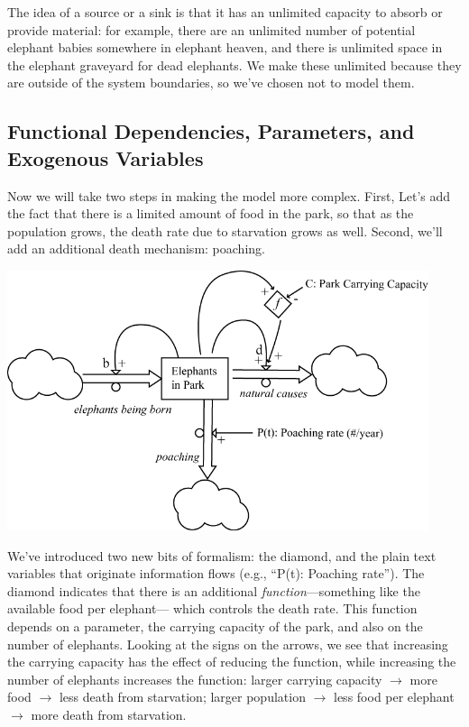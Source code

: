 The idea of a source or a sink is that it has an unlimited capacity to absorb or provide material:  for example, there are an unlimited number of potential elephant babies somewhere in elephant heaven, and there is unlimited space in the elephant graveyard for dead elephants.  We make these unlimited because they are outside of the system boundaries, so we've chosen not to model them.

\subsection{Functional Dependencies, Parameters, and Exogenous Variables}

Now we will take two steps in making the model more complex.  First, Let's add the fact that there is a limited amount of food in the park, so that as the population grows, the death rate due to starvation grows as well.  Second, we'll add an additional death mechanism:  poaching.

\beforefig
\includegraphics[height=3in]{figs/ElephantStockAndFlow2}
\afterfig


We've introduced two new bits of formalism: the diamond, and the plain text variables that originate information flows (e.g., ``P(t): Poaching rate'').  The diamond indicates that there is an additional {\it function}---something like the available food per elephant--- which controls the death rate.  This function depends on a parameter, the carrying capacity of the park, and also on the number of elephants. Looking at the signs on the arrows, we see that increasing the carrying capacity has the effect of reducing the function, while increasing the number of elephants increases the function:  larger carrying capacity $\rightarrow$ more food $\rightarrow$ less death from starvation; larger population $\rightarrow$ less food per elephant $\rightarrow$ more death from starvation.  

